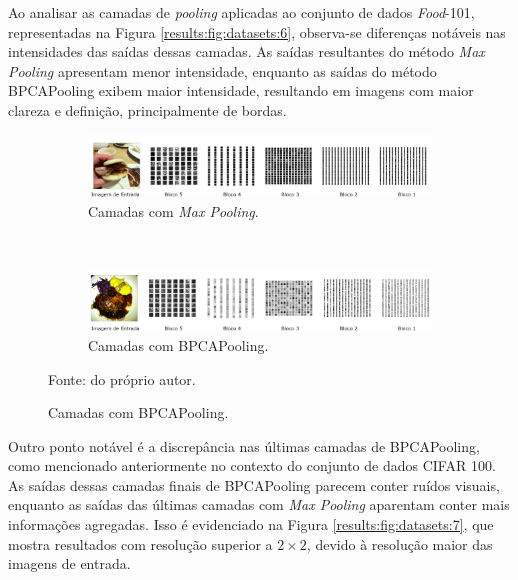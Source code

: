 Ao analisar as camadas de \textit{pooling} aplicadas ao conjunto de dados \textit{Food}-101, representadas na Figura \ref{results:fig:datasets:6}, observa-se diferenças notáveis nas intensidades das saídas dessas camadas. As saídas resultantes do método \textit{Max Pooling} apresentam menor intensidade, enquanto as saídas do método BPCAPooling exibem maior intensidade, resultando em imagens com maior clareza e definição, principalmente de bordas.

\begin{figure}[H]
   \caption{Resultado visual de camadas de \textit{pooling} do conjunto \textit{Food}-101.}
   \centering
   \label{results:fig:datasets:6}
    \begin{subfigure}[t]{1\textwidth}
        \centering
        \includegraphics[width=1\linewidth]{recursos/imagens/results/max_by_layer.png}
        \caption{Camadas com \textit{Max Pooling}.}
        \label{results:fig:datasets:6.1}
    \end{subfigure}%
    ~ 

    \begin{subfigure}[t]{1\textwidth}
        \centering
        \includegraphics[width=1\linewidth]{recursos/imagens/results/bpca_by_layer.png}
        \caption{Camadas com BPCAPooling.}
        \label{results:fig:datasets:6.2}
    \end{subfigure}%

    Fonte: do próprio autor.
\end{figure}

Outro ponto notável é a discrepância nas últimas camadas de BPCAPooling, como mencionado anteriormente no contexto do conjunto de dados CIFAR 100. As saídas dessas camadas finais de BPCAPooling parecem conter ruídos visuais, enquanto as saídas das últimas camadas com \textit{Max Pooling} aparentam conter mais informações agregadas. Isso é evidenciado na Figura \ref{results:fig:datasets:7}, que mostra resultados com resolução superior a $2 \times 2$, devido à resolução maior das imagens de entrada.

